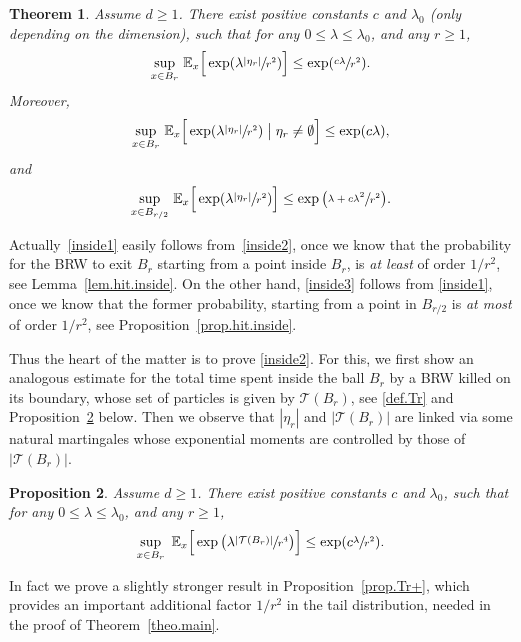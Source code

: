 \documentclass[JEP,XML,SOM,Unicode,NoFloatCountersInSection,published]{cedram}
\theoremstyle{plain}
\newtheorem{theorem}{Theorem}[section]
\newtheorem{proposition}[theorem]{Proposition}
\theoremstyle{definition}
\newcommand{\1}{{\text{\Large $\mathfrak 1$}}}
\begin{document}
\begin{theorem}\label{theo.inside}
Assume $d\ge 1$. There exist positive constants $c$ and $\lambda_0$ (only depending on the dimension), such that for any $0\le \lambda\le \lambda_0$, and any $r\ge 1$,
\begin{equation}\label{inside2}
\sup_{x\in B_r}\, \mathbb E_x\Big[\exp(\lambda \sfrac{|\eta_r|}{r^2})\Big]
\le \exp(\sfrac{c\lambda}{r^2}).
\end{equation}
Moreover,
\begin{equation}\label{inside1}
\sup_{x\in B_r} \, \mathbb E_x\Big[\exp(\lambda \sfrac{|\eta_r|}{r^2})\bigm| \eta_r\neq \emptyset\Big] \le \exp(c\lambda),
\end{equation}
and
\begin{equation}\label{inside3}
\sup_{x\in B_{r/2}} \, \mathbb E_x\Big[\exp(\lambda \sfrac{|\eta_r|}{r^2})
\Big] \le \exp\big(\sfrac{\lambda + c\lambda^2}{r^2}\big).
\end{equation}
\end{theorem}
Actually~\eqref{inside1} easily follows from~\eqref{inside2}, once we know that the probability for the BRW to exit $B_r$ starting from a point
inside $B_r$, is {\it at least} of order $1/r^2$, see Lemma~\ref{lem.hit.inside}. On the other hand, \eqref{inside3} follows from \eqref{inside1}, once we
know that the former probability, starting from a point in $B_{r/2}$ is
{\it at most} of order $1/r^2$, see Proposition~\ref{prop.hit.inside}.

Thus the heart of the matter is to prove \eqref{inside2}.
For this, we first show an analogous estimate for
the total time spent inside the ball $B_r$ by a BRW killed on its boundary,
whose set of particles is given by $\mathcal T(B_r)$,
see \eqref{def.Tr} and Proposition~\ref{prop.Tr} below.
Then we observe that $|\eta_r|$ and $|\mathcal T(B_r)|$
are linked via some natural martingales whose exponential moments are
controlled by those of $|\mathcal T(B_r)|$.
\begin{proposition}\label{prop.Tr}
Assume $d\ge 1$. There exist positive constants $c$ and $\lambda_0$,
such that for any $0\le \lambda\le \lambda_0$, and any $r\ge 1$,
\[
\sup_{x\in B_r}\ \mathbb E_x\Big[\exp\big(\lambda\sfrac{
|\mathbf{\mathcal T}(B_r)|}{r^4}\big)\Big]
\le\exp(c\sfrac{\lambda}{r^2}).
\]
\end{proposition}
In fact we prove a slightly stronger result
in Proposition~\ref{prop.Tr+}, which provides an important
additional factor $1/r^2$ in the tail distribution,
needed in the proof of Theorem~\ref{theo.main}.
\end{document}
